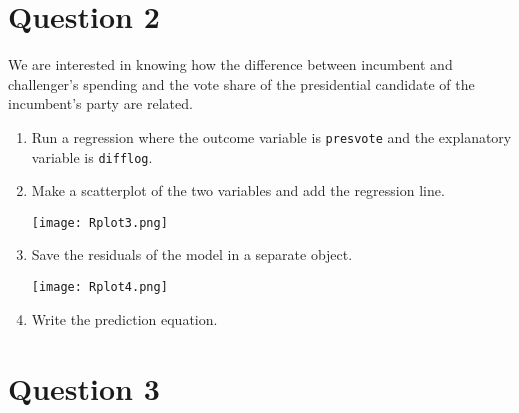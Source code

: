\documentclass[12pt,letterpaper]{article}
\begin{document}
\section*{Question 2}%
\noindent We are interested in knowing how the difference between incumbent and challenger's spending and the vote share of the presidential candidate of the incumbent's party are related.	\vspace{.25cm}
\begin{enumerate}
\item Run a regression where the outcome variable is \texttt{presvote} and the explanatory variable is \texttt{difflog}.	\vspace{5cm}

		 
		
\item Make a scatterplot of the two variables and add the regression line. 	\vspace{5cm}

		 
		
									\texttt{[image: Rplot3.png]}
		
\item Save the residuals of the model in a separate object.	\vspace{5cm}

		 
		
							\texttt{[image: Rplot4.png]}
		
\item Write the prediction equation.
\end{enumerate}

		 
		
\newpage	
\section*{Question 3}%
\end{document}
